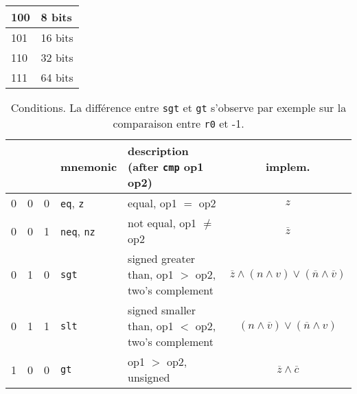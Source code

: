 \documentclass[architecture]{compas2018}
\begin{document}
\begin{table}
\begin{tabular}{|l|l|}
    \hline
    100           & 8 bits                                                                         \\
    \hline
    101           & 16 bits                                                                        \\
    \hline
    110           & 32 bits                                                                        \\
    \hline
    111           & 64 bits                                                                        \\
    \hline
  \end{tabular}
\end{table}
\newcommand{\bool}{\mathbb{B}}
\newcommand{\booland}{\wedge}
\newcommand{\boolor}{\vee}
\newcommand{\boolnot}[1]{\overline{#1}}
\begin{table} 
  \caption{Conditions. La différence entre \texttt{sgt} et \texttt{gt} s'observe par exemple sur la comparaison entre \texttt{r0} et -1.
}
  \label{tab:conditions}
\begin{center}
  \begin{tabular}{|c|c|c||l||l|c|}
    \hline  
      &   &   & mnemonic                  & description (after \texttt{cmp} op1 op2)           & {implem.}                                                                           \\
    \hline  
    \hline  
    0 & 0 & 0 & \texttt{eq}, \texttt{z}   & equal, op1 $=$ op2                                 & $z$                                                                                 \\
    \hline
    0 & 0 & 1 & \texttt{neq}, \texttt{nz} & not equal, op1 $\neq$ op2                          & $\boolnot{z}$                                                                       \\
    \hline
    0 & 1 & 0 & \texttt{sgt}              & signed greater than, op1 $>$ op2, two's complement & $\boolnot{z} \booland (n \booland {v}) \boolor (\boolnot{n} \booland \boolnot{v}) $ \\
    \hline
    0 & 1 & 1 & \texttt{slt}              & signed smaller than, op1 $<$ op2, two's complement & $(n \booland \boolnot{v}) \boolor (\boolnot{n} \booland v) $                        \\
    \hline
    1 & 0 & 0 & \texttt{gt}               & op1 $>$ op2, unsigned                              & $\boolnot{z} \booland \boolnot{c}$                                                  \\

\end{tabular}
\end{center}
\end{table}
\end{document}
